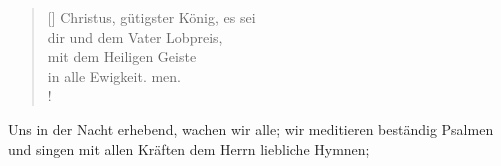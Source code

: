 {\begin{multicols}{2}
\begin{verse}[\versewidth]
{{ Christus, gütigster König, es sei\\
dir und dem Vater Lobpreis,\\
mit dem Heiligen Geiste\\
in alle Ewigkeit. men.\\!}}


\end{verse} 
\end{multicols}
}

\smallskip


\def\greinitialformat#1{{\fontsize{40}{40}\selectfont #1}}
\gresetfirstlineaboveinitial{\small \textcolor{red}{æstate}}{}
\setaboveinitialseparation{0.72mm}

\medskip


\begin{sloppypar}
{\noindent\rm{ Uns in der Nacht erhebend, wachen wir alle; 
wir meditieren beständig Psalmen und singen mit allen Kräften dem Herrn liebliche Hymnen;}}
\end{sloppypar}

\newpage

